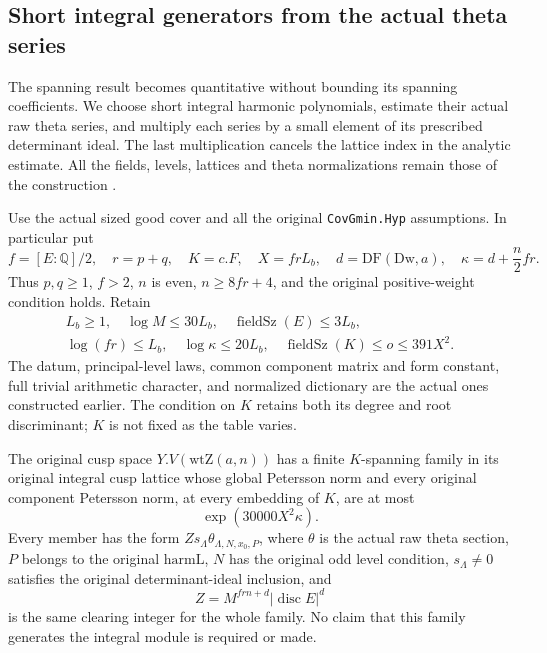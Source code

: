\subsection{Short integral generators from the actual theta series}
\label{sec:actual-short-theta-generators}

The spanning result becomes quantitative without bounding its spanning
coefficients.  We choose short integral harmonic polynomials, estimate
their actual raw theta series, and multiply each series by a small
element of its prescribed determinant ideal.  The last multiplication
cancels the lattice index in the analytic estimate.  All the fields,
levels, lattices and theta normalizations remain those of the construction
\cite{theta-short-source}.

Use the actual sized good cover and all the original
\texttt{CovGmin.Hyp} assumptions.  In particular put
\[
 f=[E:\mathbb Q]/2,\quad r=p+q,\quad K=c.F,\quad
 X=frL_b,\quad d=\mathrm{DF}(\mathrm{Dw},a),\quad
 \kappa=d+\frac n2fr.
\]
Thus $p,q\ge1$, $f>2$, $n$ is even, $n\ge8fr+4$, and the
original positive-weight condition holds.  Retain
\[
 \begin{gathered}
 L_b\ge1,\quad \log M\le30L_b,\quad
 \operatorname{fieldSz}(E)\le3L_b,\\
 \log(fr)\le L_b,\quad \log\kappa\le20L_b,\quad
 \operatorname{fieldSz}(K)\le o\le391X^2.
 \end{gathered}
\]
The datum, principal-level laws, common component matrix and form
constant, full trivial arithmetic character, and normalized dictionary
are the actual ones constructed earlier.  The condition on $K$ retains
both its degree and root discriminant; $K$ is not fixed as the table
varies.

\begin{theorem}
\label{thm:actual-short-theta-generators}
The original cusp space $Y.V(\mathrm{wtZ}(a,n))$ has a finite
$K$-spanning family in its original integral cusp lattice whose global
Petersson norm and every original component Petersson norm, at every
embedding of $K$, are at most
\begin{equation}\label{eq:actual-short-theta-bound}
                         \exp(30000X^2\kappa).
\end{equation}
Every member has the form $Zs_\Lambda\theta_{\Lambda,N,x_0,P}$,
where $\theta$ is the actual raw theta section, $P$ belongs to the
original $\mathrm{harmL}$, $N$ has the original odd level condition,
$s_\Lambda\ne0$ satisfies the original determinant-ideal inclusion,
and
\[
             Z=M^{frn+d}|\operatorname{disc}E|^d
\]
is the same clearing integer for the whole family.  No claim that this
family generates the integral module is required or made.
\end{theorem}

